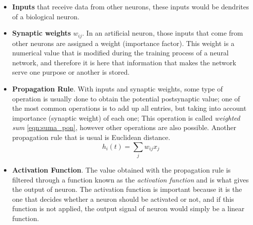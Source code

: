 \begin{itemize}
\item \textbf{Inputs} that receive data from other neurons, these inputs would be dendrites of a biological neuron.
\item \textbf{Synaptic weights} $w_{ij}$. In an artificial neuron, those inputs that come from other neurons are assigned a weight (importance factor). This weight is a numerical value that is modified during the training process of a neural network, and therefore it is here that information that makes the network serve one purpose or another is stored.
\item \textbf{Propagation Rule}. With inputs and synaptic weights, some type of operation is usually done to obtain the potential postsynaptic value; one of the most common operations is to add up all entries, but taking into account importance (synaptic weight) of each one; This operation is called \textit{weighted sum} \ref{eqn:suma_pon}, however other operations are also possible. Another propagation rule that is usual is Euclidean distance.
\begin{equation}
h_{i}(t) = \sum_{j}{w_{ij}x_{j}}
\label{eqn:suma_pon}
\end{equation}
\item \textbf{Activation Function}. The value obtained with the propagation rule is filtered through a function known as the \textit{activation function} and is what gives the output of neuron. The activation function is important because it is the one that decides whether a neuron should be activated or not, and if this function is not applied, the output signal of neuron would simply be a linear function.

\end{itemize}
